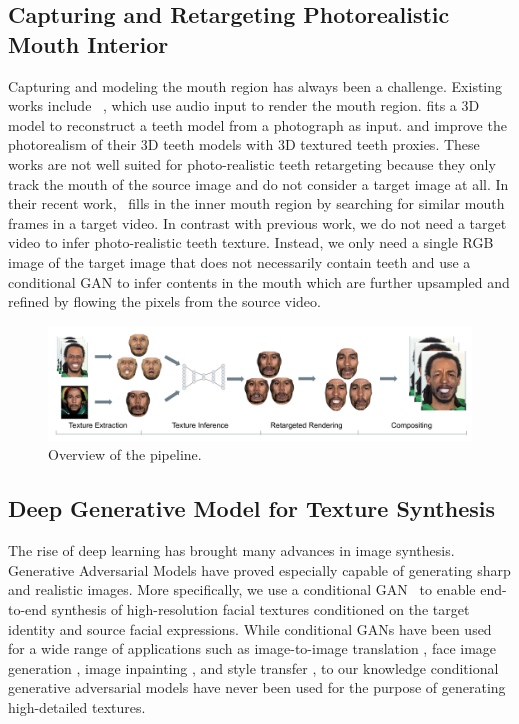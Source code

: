 \subsection{Capturing and Retargeting Photorealistic Mouth Interior}
Capturing and modeling the mouth region has always been a challenge. Existing works include ~\cite{Chuang:2005:MSE,Wampler:2007:DES,Taylor:2012:DUV,FanWSX15,edwardsjali}, which use audio input to render the mouth region. \cite{wu2016model} fits a 3D model to reconstruct a teeth model from a photograph as input. 
\cite{garrido2015vdub} and \cite{thies2015real} improve the photorealism of their 3D teeth models with 3D textured teeth proxies.
These works are not well suited for photo-realistic teeth retargeting because they only track the mouth of the source image and do not consider a target image at all.
 In their recent work,~\cite{f2f} fills in the inner mouth region by searching for similar mouth frames in a target video.  
In contrast with previous work, we do not need a target video to infer photo-realistic teeth texture. 
Instead, we only need a single RGB image of the target image that does not necessarily contain teeth and use a conditional GAN to infer contents in the mouth which are further upsampled and refined by flowing the pixels from the source video.   

\begin{figure}[t]
	\centering
	\includegraphics[width=1\linewidth]{figures/overview/pipeline_new2.png}
	\caption{Overview of the pipeline.}\label{fig:arch_content}
	\vspace{-0.15in}
\end{figure}


\subsection{Deep Generative Model for Texture Synthesis}

The rise of deep learning has brought many advances in image synthesis. Generative Adversarial Models \cite{gan} have proved especially capable of generating sharp and realistic images. 
More specifically, we use a conditional GAN~\cite{cgan} to enable end-to-end synthesis of high-resolution facial textures conditioned on the target identity and source facial expressions. While conditional GANs have been used for a wide range of applications such as image-to-image translation \cite{pix2pix}, face image generation \cite{gauthier2014}, image inpainting \cite{pathak2016context, yang2016high}, and style transfer \cite{li2016precomputed}, to our knowledge conditional generative adversarial models have never been used for the purpose of generating high-detailed textures.

